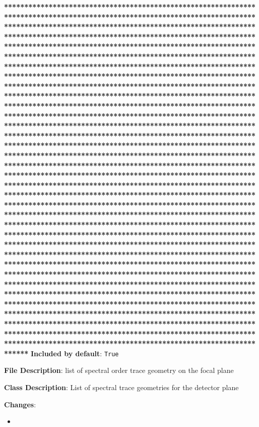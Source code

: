 \textbf{****************************************************************************************************************************************************************************************************************************************************************************************************************************************************************************************************************************************************************************************************************************************************************************************************************************************************************************************************************************************************************************************************************************************************************************************************************************************************************************************************************************************************************************************************************************************************************************************************************************************************************************************************************************************************************************************************************************************************************************************************************************************************************************************************************************************************************************************************************************************************************************************************************************************************************************************************************************************************************************************************************************************************************************************************************************************************************************************************************************************************************}
\textbf{Included by default}: \texttt{True}

\textbf{File Description}: list of spectral order trace geometry on the focal plane

\textbf{Class Description}: List of spectral trace geometries for the detector plane

\textbf{Changes}:

\begin{itemize}
\item \end{itemize}


